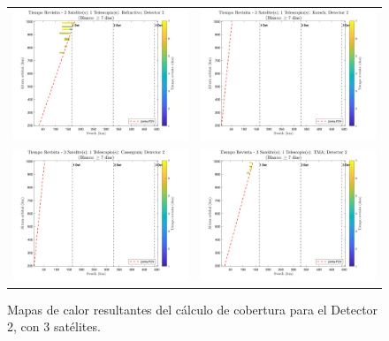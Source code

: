 \begin{landscape}
\begin{figure}[p]
\centering
\vspace*{0.3cm}
\setlength{\tabcolsep}{4pt}
\renewcommand{\arraystretch}{0}
\begin{tabular}{cc}
\includegraphics[width=0.48\linewidth]{4.Payload/Coverage/heatmap_3 Satelite(s); 1 Telescopio(s): Refractivo; Detector 2.jpg} &
\includegraphics[width=0.48\linewidth]{4.Payload/Coverage/heatmap_3 Satelite(s); 1 Telescopio(s): Korsch; Detector 2.jpg} \\
\includegraphics[width=0.48\linewidth]{4.Payload/Coverage/heatmap_3 Satelite(s); 1 Telescopio(s): Cassegrain; Detector 2.jpg} &
\includegraphics[width=0.48\linewidth]{4.Payload/Coverage/heatmap_3 Satelite(s); 1 Telescopio(s): TMA; Detector 2.jpg} \\
\end{tabular}
\caption{Mapas de calor resultantes del cálculo de cobertura para el Detector 2, con 3 satélites.}
\end{figure}
\end{landscape}

